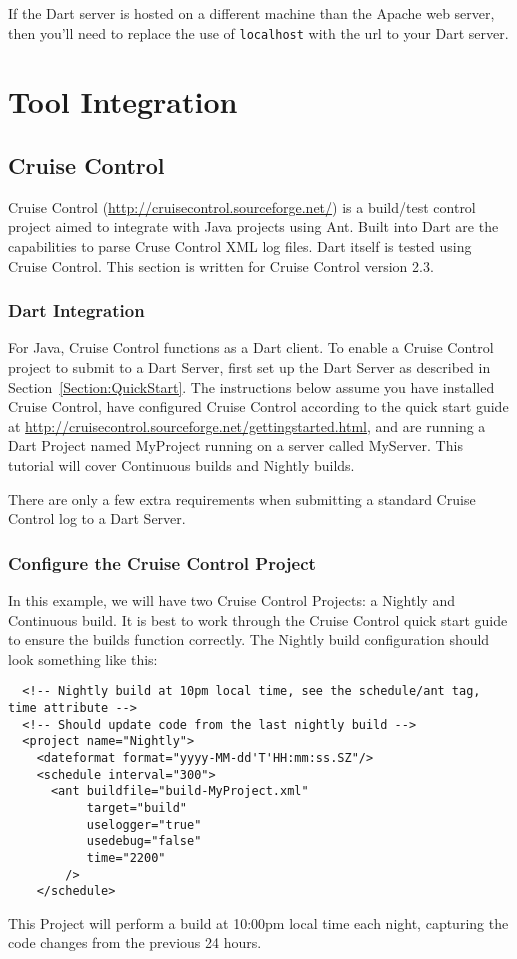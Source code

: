 \documentclass{InsightBook}
\begin{document}
If the Dart server is hosted on a different machine than the Apache
web server, then you'll need to replace the use of \texttt{localhost} with
the url to your Dart server.


\chapter{Tool Integration}
\section{Cruise Control}
Cruise Control (\url{http://cruisecontrol.sourceforge.net/}) is a
build/test control project aimed to integrate with Java projects using
Ant.  Built into Dart are the capabilities to parse Cruse Control XML
log files.  Dart itself is tested using Cruise Control.  This section
is written for Cruise Control version 2.3.

\subsection{Dart Integration}
For Java, Cruise Control functions as a Dart client.  To enable a
Cruise Control project to submit to a Dart Server, first set up the
Dart Server as described in Section~\ref{Section:QuickStart}.  The
instructions below assume you have installed Cruise Control, have
configured Cruise Control according to the quick start guide at
\url{http://cruisecontrol.sourceforge.net/gettingstarted.html}, and
are running a Dart Project named MyProject running on a server called
MyServer.  This tutorial will cover Continuous builds and Nightly builds.

There are only a few extra requirements when submitting a standard Cruise Control log
to a Dart Server.

\subsection{Configure the Cruise Control Project}
In this example, we will have two Cruise Control Projects: a Nightly
and Continuous build.  It is best to work through the Cruise Control quick start
guide to ensure the builds function correctly.  The Nightly build
configuration should look something like this:
\begin{verbatim}
  <!-- Nightly build at 10pm local time, see the schedule/ant tag, time attribute -->
  <!-- Should update code from the last nightly build -->
  <project name="Nightly">
    <dateformat format="yyyy-MM-dd'T'HH:mm:ss.SZ"/>
    <schedule interval="300"> 
      <ant buildfile="build-MyProject.xml"
           target="build"
           uselogger="true"
           usedebug="false"
           time="2200"
        />
    </schedule>
\end{verbatim}
This Project will perform a build at 10:00pm local time each night,
capturing the code changes from the previous 24 hours.
\end{document}
